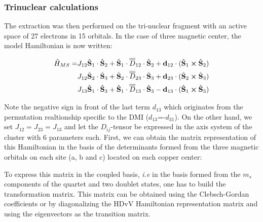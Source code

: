 \documentclass[10pt]{report}
\numberwithin{equation}{section}
\begin{document}
\subsubsection*{Trinuclear calculations}

The extraction was then performed on the tri-nuclear fragment with an active space of 27 electrons in 15 orbitals.
In the case of three magnetic center, the model Hamiltonian is now written:


\begin{equation}
    \begin{split}
    \hat{H}_{MS}=&J_{12} \hat{\vb S}_1 \cdot \hat{\vb S}_2 + \hat{\vb S}_1 \cdot\overline{\overline{D}}_{12} \cdot \hat{\vb S}_2 + \vb{d}_{12} \cdot (\hat{\vb S}_1 \cross \hat{\vb S}_2)\\
    &J_{12} \hat{\vb S}_2 \cdot \hat{\vb S}_3 + \hat{\vb S}_2 \cdot\overline{\overline{D}}_{23} \cdot \hat{\vb S}_3 + \vb{d}_{23} \cdot (\hat{\vb S}_2 \cross \hat{\vb S}_3)\\
    &J_{13} \hat{\vb S}_1 \cdot \hat{\vb S}_3 + \hat{\vb S}_1 \cdot\overline{\overline{D}}_{13} \cdot \hat{\vb S}_3 - \vb{d}_{13} \cdot (\hat{\vb S}_1 \cross \hat{\vb S}_3)
    \end{split}
\end{equation}

Note the negative sign in front of the last term $d_{13}$ which originates from the permutation realtionship specific to the DMI ($d_{13}$=-$d_{31}$).
On the other hand, we set $J_{12}=J_{23}=J_{13}$ and let the $D_{ij}$-tensor be expressed in the axis system of the cluster with 6 parameters each.
First, we can obtain the matrix representation of this Hamiltonian in the basis of the determinants formed from the three magnetic orbitals on each site (a, b and c) located on each copper center:


To express this matrix in the coupled basis, \textit{i.e} in the basis formed from the $m_s$ components of the quartet and two doublet states, one has to build the transformation matrix.
This matrix can be obtained using the Clebsch-Gordan coefficients or by diagonalizing the HDvV Hamiltonian representation matrix and using the eigenvectors as the transition matrix.
\end{document}
